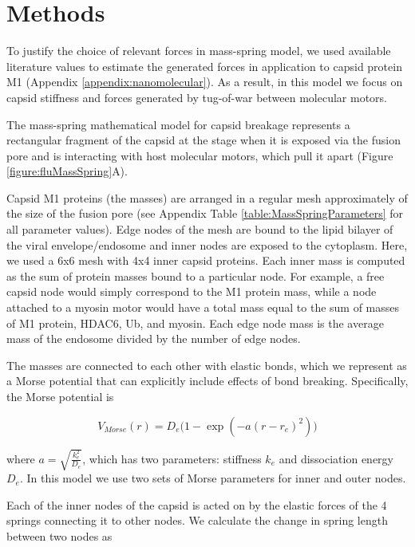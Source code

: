 \section{Methods}
\label{ch:TugOfWarMethods}

To justify the choice of relevant forces in mass-spring model, we used available literature values to estimate the generated forces in application to capsid protein M1 (Appendix \ref{appendix:nanomolecular}). As a result, in this model we focus on capsid stiffness and forces generated by tug-of-war between molecular motors.

The mass-spring mathematical model for capsid breakage represents a rectangular fragment of the capsid at the stage when it is exposed via the fusion pore and is interacting with host molecular motors, which pull it apart (Figure \ref{figure:fluMassSpring}A).

Capsid M1 proteins (the masses) are arranged in a regular mesh approximately of the size of the fusion pore (see Appendix Table \ref{table:MassSpringParameters} for all parameter values). Edge nodes of the mesh are bound to the lipid bilayer of the viral envelope/endosome and inner nodes are exposed to the cytoplasm. Here, we used a 6x6 mesh with 4x4 inner capsid proteins. Each inner mass is computed as the sum of protein masses bound to a particular node. For example, a free capsid node would simply correspond to the M1 protein mass, while a node attached to a myosin motor would have a total mass equal to the sum of masses of M1 protein, HDAC6, Ub, and myosin. Each edge node mass is the average mass of the endosome divided by the number of edge nodes.

The masses are connected to each other with elastic bonds, which we represent as a Morse potential that can explicitly include effects of bond breaking. Specifically, the Morse potential is

\begin{equation}
V_{Morse} (r) = D_e \big(1 - \exp(-a(r - r_e)^2)\big)
\end{equation}

where  $a = \sqrt{\frac{k^2_e}{D_e}}$, which has two parameters: stiffness $k_e$ and dissociation energy $D_e$. In this model we use two sets of Morse parameters for inner and outer nodes.

Each of the inner nodes of the capsid is acted on by the elastic forces of the 4 springs connecting it to other nodes. We calculate the change in spring length between two nodes as

